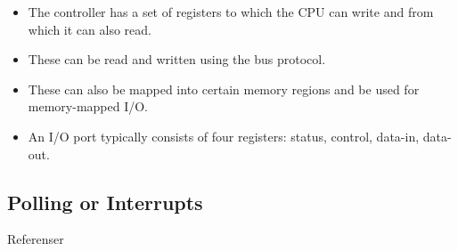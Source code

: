\documentclass{beamer}
\begin{document}
\begin{frame}{\insertsubsectionhead}
  \begin{itemize}
    \item The controller has a set of registers to which the CPU can write and 
      from which it can also read.

    \item These can be read and written using the bus protocol.

    \item These can also be mapped into certain memory regions and be used for 
      memory-mapped I/O.

    \item An I/O port typically consists of four registers: status, control, 
      data-in, data-out.

  \end{itemize}
\end{frame}

\subsection{Polling or Interrupts}

\begin{frame}{\insertsubsectionhead}
  \begin{itemize}
  \end{itemize}
\end{frame}



\begin{frame}[allowframebreaks]{Referenser}
  \small
  \printbibliography
\end{frame}
\end{document}
